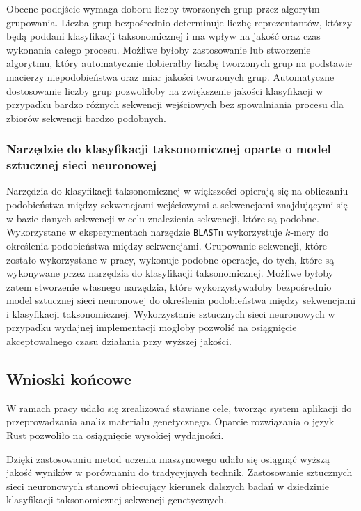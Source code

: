             Obecne podejście wymaga doboru liczby tworzonych grup przez algorytm grupowania. Liczba grup bezpośrednio determinuje liczbę reprezentantów, którzy będą poddani klasyfikacji taksonomicznej i ma wpływ na jakość oraz czas wykonania całego procesu. Możliwe byłoby zastosowanie lub stworzenie algorytmu, który automatycznie dobierałby liczbę tworzonych grup na podstawie macierzy niepodobieństwa oraz miar jakości tworzonych grup. Automatyczne dostosowanie liczby grup pozwoliłoby na zwiększenie jakości klasyfikacji w przypadku bardzo różnych sekwencji wejściowych bez spowalniania procesu dla zbiorów sekwencji bardzo podobnych.

        \subsubsection{Narzędzie do klasyfikacji taksonomicznej oparte o model sztucznej sieci neuronowej}

            Narzędzia do klasyfikacji taksonomicznej w większości opierają się na obliczaniu podobieństwa między sekwencjami wejściowymi a sekwencjami znajdującymi się w bazie danych sekwencji w celu znalezienia sekwencji, które są podobne. Wykorzystane w eksperymentach narzędzie \texttt{BLASTn} wykorzystuje $k$-mery do określenia podobieństwa między sekwencjami. 
            Grupowanie sekwencji, które zostało wykorzystane w pracy, wykonuje podobne operacje, do tych, które są wykonywane przez narzędzia do klasyfikacji taksonomicznej. Możliwe byłoby zatem stworzenie własnego narzędzia, które wykorzystywałoby bezpośrednio model sztucznej sieci neuronowej do określenia podobieństwa między sekwencjami i klasyfikacji taksonomicznej. Wykorzystanie sztucznych sieci neuronowych w przypadku wydajnej implementacji mogłoby pozwolić na osiągnięcie akceptowalnego czasu działania przy wyższej jakości.

    \subsection{Wnioski końcowe}

        W ramach pracy udało się zrealizować stawiane cele, tworząc system aplikacji do przeprowadzania analiz materiału genetycznego. Oparcie rozwiązania o język Rust pozwoliło na osiągnięcie wysokiej wydajności. 
        
        Dzięki zastosowaniu metod uczenia maszynowego udało się osiągnąć wyższą jakość wyników w porównaniu do tradycyjnych technik. Zastosowanie sztucznych sieci neuronowych stanowi obiecujący kierunek dalszych badań w dziedzinie klasyfikacji taksonomicznej sekwencji genetycznych.